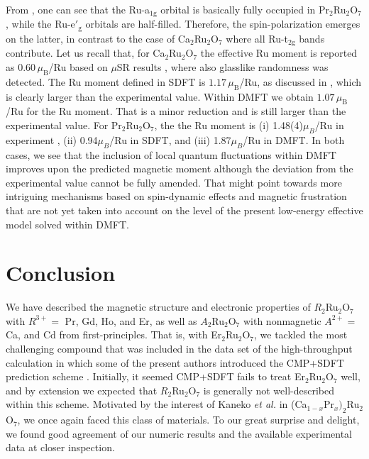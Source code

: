 \documentclass[10pt]{iopart}
\newcommand{\mub}{\,\mu_\text{B}}
\begin{document}
From , one can see that the Ru-a$_{1\mathrm{g}}$ orbital is basically fully occupied in Pr$_2$Ru$_2$O$_7$, while the Ru-e$'_{\mathrm{g}}$ orbitals are half-filled. Therefore, the spin-polarization emerges on the latter, in contrast to the case of Ca$_2$Ru$_2$O$_7$ where all Ru-t$_{2\mathrm{g}}$ bands contribute. Let us recall that, for Ca$_2$Ru$_2$O$_7$ the effective Ru moment is reported as $0.60\mub$/Ru based on $\mu$SR results \cite{miyazaki2010magnetic}, where also glasslike randomness was detected. The Ru moment defined in SDFT is $1.17\mub$/Ru, as discussed in , which is clearly larger than the experimental value. Within DMFT we obtain $1.07\mub$/Ru for the Ru moment. That is a minor reduction and is still larger than the experimental value. For Pr$_2$Ru$_2$O$_7$, the the Ru moment is (i) 1.48(4)$\mu_B$/Ru in experiment \cite{van2017induced}, (ii) 0.94$\mu_B$/Ru in SDFT, and (iii) 1.87$\mu_B$/Ru in DMFT.
In both cases, we see that the inclusion of local quantum fluctuations within DMFT improves upon the predicted magnetic moment although the deviation from the experimental value cannot be fully amended. That might point towards more intriguing mechanisms based on spin-dynamic effects and magnetic frustration that are not yet taken into account on the level of the present low-energy effective model solved within DMFT.

\section{Conclusion} \label{sec:Conclusion}

We have described the magnetic structure and electronic properties of $R_2$Ru$_2$O$_7$ with $R^{3+}=$ Pr, Gd, Ho, and Er, as well as $A_2$Ru$_2$O$_7$ with nonmagnetic $A^{2+}=$ Ca, and Cd from first-principles. 
That is, with Er$_2$Ru$_2$O$_7$, we tackled the most challenging compound that was included in the data set of the high-throughput calculation in which some of the present authors introduced the CMP+SDFT prediction scheme \cite{huebsch2021benchmark}. Initially, it seemed CMP+SDFT fails to treat Er$_2$Ru$_2$O$_7$ well, and by extension we expected that $R_2$Ru$_2$O$_7$ is generally not well-described within this scheme. Motivated by the interest of Kaneko {\it et al.} \cite{kaneko2020,kaneko2021fully} in (Ca$_{1-x}$Pr$_x)_2$Ru$_2$O$_7$, we once again faced this class of materials. To our great surprise and delight, we found good agreement of our numeric results and the available experimental data at closer inspection.
\end{document}
